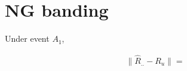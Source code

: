 \section{NG banding}
Under event $A_1$, 

\begin{equation}
    \begin{split}
        \| \hat R_{..} - R_u \| = 
    \end{split}
\end{equation}